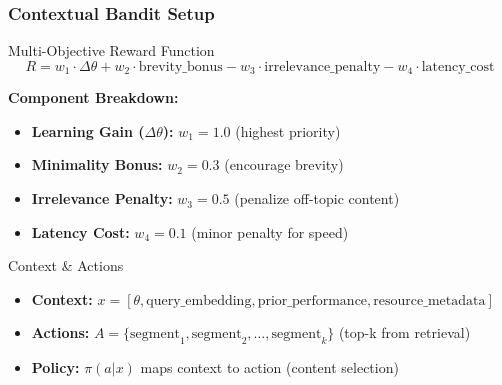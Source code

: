 \documentclass[aspectratio=169]{beamer}
\begin{document}
\begin{frame}
\frametitle{Contextual Bandit Setup}
\begin{block}{Multi-Objective Reward Function}
\[
R = w_1 \cdot \Delta\theta + w_2 \cdot \text{brevity\_bonus} - w_3 \cdot \text{irrelevance\_penalty} - w_4 \cdot \text{latency\_cost}
\]

\textbf{Component Breakdown:}
\begin{itemize}
\item \textbf{Learning Gain ($\Delta\theta$):} $w_1 = 1.0$ (highest priority)
\item \textbf{Minimality Bonus:} $w_2 = 0.3$ (encourage brevity)
\item \textbf{Irrelevance Penalty:} $w_3 = 0.5$ (penalize off-topic content)
\item \textbf{Latency Cost:} $w_4 = 0.1$ (minor penalty for speed)
\end{itemize}
\end{block}

\begin{block}{Context \& Actions}
\begin{itemize}
\item \textbf{Context:} $x = [\theta, \text{query\_embedding}, \text{prior\_performance}, \text{resource\_metadata}]$
\item \textbf{Actions:} $A = \{\text{segment}_1, \text{segment}_2, \ldots, \text{segment}_k\}$ (top-k from retrieval)
\item \textbf{Policy:} $\pi(a|x)$ maps context to action (content selection)
\end{itemize}
\end{block}
\end{frame}
\end{document}
